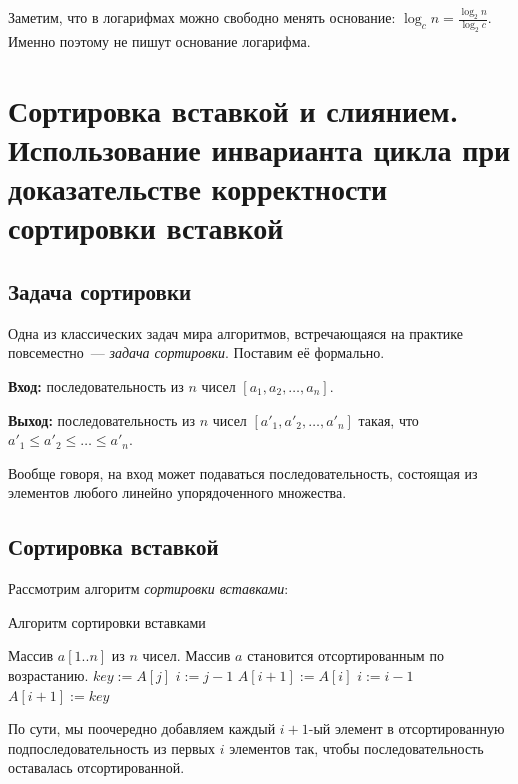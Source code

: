 \documentclass[a4paper,12pt]{article}
\begin{document}
Заметим, что в логарифмах можно свободно менять основание: $\log_c n = \frac {\log_2 n}{\log_2 c}$. Именно поэтому не пишут основание логарифма.
\newpage
\section{Сортировка вставкой и слиянием. Использование инварианта цикла при доказательстве корректности сортировки вставкой}

\subsection{Задача сортировки}
Одна из классических задач мира алгоритмов, встречающаяся на практике повсеместно~--- \emph{задача сортировки}. Поставим её формально.

\textbf{Вход:} последовательность из \(n\) чисел \([a_{1}, a_{2}, \ldots, a_{n}]\).

\textbf{Выход:} последовательность из \(n\) чисел \([a'_{1}, a'_{2}, \ldots, a'_{n}]\) такая, что \(a'_{1} \leqslant a'_{2} \leqslant \ldots \leqslant a'_{n}\).

Вообще говоря, на вход может подаваться последовательность, состоящая из элементов любого линейно упорядоченного множества.

\subsection{Сортировка вставкой} 
Рассмотрим алгоритм \emph{сортировки вставками}:

\begin{algorithm}[H]
	\caption{Алгоритм сортировки вставками}
	\label{algo:insertion-sort}
	\begin{algorithmic}[1]
		\Require Массив $a[1..n]$ из $n$ чисел. 
		\Ensure Массив $a$ становится отсортированным по возрастанию.
		\State \(key \mathrel{:=} A[j]\)
		\State \(i \mathrel{:=} j - 1\)
		\State \(A[i + 1] \mathrel{:=} A[i]\)
		\State \(i \mathrel{:=} i - 1\)
		\EndWhile
		\State \(A[i + 1] \mathrel{:=} key\)
		\EndFor
		\EndFunction
	\end{algorithmic}
\end{algorithm}

По сути, мы поочередно добавляем каждый $i + 1$-ый элемент в отсортированную подпоследовательность из первых $i$ элементов так, чтобы последовательность оставалась отсортированной.
\end{document}
